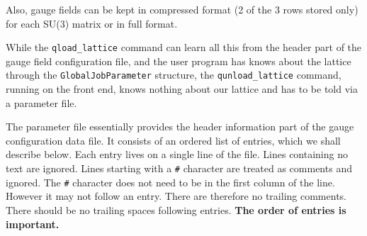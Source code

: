 Also, gauge fields can be kept in compressed format (2 of the 3 rows stored
 only) for each SU(3) matrix or in full format.

While the {\tt qload\_lattice} command can learn all this from the header 
part of the gauge field configuration file, and the user program 
has knows about the lattice through the {\tt GlobalJobParameter} structure,
the {\tt qunload\_lattice} command, running on the front end, knows nothing
about our lattice and has to be told via a parameter file.

The parameter file essentially provides the header information part of the
gauge configuration data file. It consists of an ordered list of entries, 
which we shall describe below. Each entry lives on a single line of the file.
Lines containing no text are ignored. Lines starting with a {\tt \#} character
are treated as comments and ignored. The {\tt \#} character does not 
need to be in the first column of the line. However it may not follow
an entry. There are therefore no trailing comments. There should be 
no trailing spaces following entries. {\bf The order of entries is important.}

